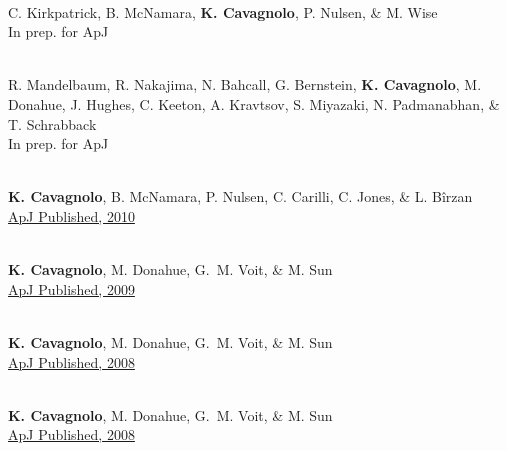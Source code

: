 \documentclass[12pt]{cv}
\begin{document}
\begin{llist}
{}\\
C. Kirkpatrick, B. McNamara, {\bf K. Cavagnolo}, P. Nulsen, \& M. Wise\\
In prep. for ApJ

{}\\
R. Mandelbaum, R. Nakajima, N. Bahcall, G. Bernstein, {\bf K. Cavagnolo}, M. Donahue, J. Hughes, C. Keeton, A. Kravtsov, S. Miyazaki, N. Padmanabhan, \& T. Schrabback\\
In prep. for ApJ



{}\\
{\bf K. Cavagnolo}, B. McNamara, P. Nulsen, C. Carilli, C. Jones, \& L. B\^irzan\\
\href{http://adsabs.harvard.edu/abs/2010ApJ...720.1066C}{ApJ Published, 2010}

{}\\
{\bf K. Cavagnolo}, M. Donahue, G.~M. Voit, \& M. Sun\\
\href{http://adsabs.harvard.edu/abs/2009ApJS..182...12C}{ApJ Published, 2009}

{}\\
{\bf K. Cavagnolo}, M. Donahue, G.~M. Voit, \& M. Sun\\
\href{http://adsabs.harvard.edu/abs/2008ApJ...683L.107C}{ApJ Published, 2008}

{}\\
{\bf K. Cavagnolo}, M. Donahue, G.~M. Voit, \& M. Sun\\
\href{http://adsabs.harvard.edu/abs/2008ApJ...682..821C}{ApJ Published, 2008}



\end{llist}
\end{document}
